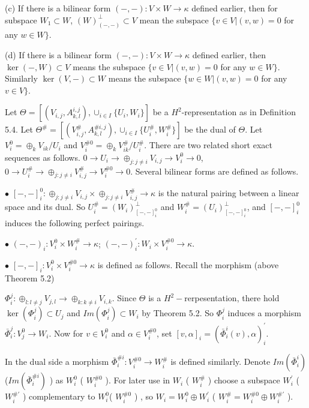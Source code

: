 \def\CTEXPreproc{Created by ctex v0.2.12, don't edit!}\documentclass[11pt]{article}
\begin{document}
(c) If there is a bilinear form $(-,-): V\times W \rightarrow \kappa$ defined earlier, then for subspace $W_1 \subset W$, $(W)^{\perp}_{(-,-)} \subset V $ mean the subspace $\{ v\in V | (v ,w)=0 $ for any $ w\in W \}  $.

(d) If there is a bilinear form $(-,-): V\times W\rightarrow \kappa$ defined earlier, then $\ker( -, W  )\subset V$ means the subspace
$\{  v\in V | (v,w)=0 $ for any $ w\in W  \}$. Similarly   $\ker( V, -  )\subset W$ means the subspace
$\{  w\in W | (v,w)=0 $ for any $ v\in V  \}$.



Let $\Theta = [ ( V_{i,j} , A^{i,j}_{k,l} ) ,  \cup_{i\in I} \{ U_i ,W_i \}    ] $ be a $H^2$-representation as in Definition 5.4.  Let $\Theta^{\#} = [ ( V^{\#} _{i,j} , A^{\# i,j}_{k,l} ) ,  \cup_{i\in I} \{ U^{\#} _i ,W^{\#}_i \}    ] $ be the dual of $\Theta$.
Let $V^0 _i = \oplus_{k} V_{ik} / U_i  $ and $ V^{\# 0}_i = \oplus_{k} V^{\#} _{ik} / U^{\#} _i   $. There are two related short exact sequences as follows.
 $0\rightarrow U_i \rightarrow \oplus_{j:j\neq i} V_{i,j} \rightarrow V^0 _i \rightarrow 0  $,
$0\rightarrow U^{\#} _i \rightarrow \oplus_{j:j\neq i} V^{\#} _{i,j} \rightarrow V^{\# 0} _i \rightarrow 0   $.  Several bilinear forms are defined as follows.

\noindent $\bullet$ $ [-,-]^{0} _i : \oplus_{j:j\neq i} V_{i,j} \times \oplus_{j:j\neq i}  V^{\#} _{i,j}   \rightarrow \kappa  $ is the natural pairing between a linear space and its dual. So $ U^{\#}_i = (W_i )^{\perp}_{ [-,-]^{0} _i} $ and $ W^{\#}_i = ( U_i )^{\perp}_{ [-,-]^{0} _i}  $, and  $[-,-]^{0} _i$ induces the following  perfect pairings.

\noindent $\bullet$ $(-,- )_i : V^0 _i \times W^{\#}_i \rightarrow \kappa   $;  $ (-,- )^{'}_i : W_i \times V^{\#0}_i \rightarrow \kappa. $

\noindent $\bullet$  $[-,-]_i : V^0 _i \times V^{\# 0}_i \rightarrow \kappa $ is defined as follows. Recall the morphism (above Theorem 5.2)

\noindent$\Phi^j _i : \oplus_{l:l\neq j} V_{j,l} \rightarrow  \oplus_{k:k\neq i} V_{i,k} $. Since $\Theta$ is a $H^2 -$rerpesentation, there hold   $\ker (\Phi^j _i  )\subset U_j  $ and $ Im (\Phi^j _i )\subset W_i $ by Theorem 5.2.  So $\Phi^j _i$  induces a morphism
 $\bar{\Phi}^j _i : V^0 _j \rightarrow W_i $. Now for  $v\in V^0 _i $ and $\alpha \in V^{\# 0}_i $,   set
 $ [ v ,\alpha ]_i =( \bar{\Phi}^i _i (v),  \alpha   )^{'} _i  $.

In the dual side a morphism $\bar{\Phi}^{\# i} _i : V^{\# 0}_i \rightarrow W^{\#} _i $ is defined similarly. Denote $Im( \bar{\Phi}^i _i )$  ($Im ( \bar{\Phi}^{\# i} _i  )   $   ) as  $W^0 _i$ ( $ W^{\# 0}_i  $   ). For later use in $W_i$ ( $W^{\# }_i $   ) choose a subspace
 $W^{'}_i$ ( $W^{\# '}_i $ ) complementary to $W^0 _i$(  $W^{\# 0}_i$  ) , so $W_i = W^0 _i \oplus W^{'}_i $ ( $W^{\#}_i = W^{\# 0}_i \oplus W^{\# '} _i  $  ).
\end{document}
